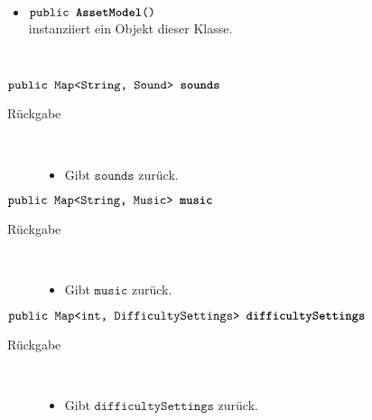 \begin{description}
\begin{itemize}
		\end{itemize}
	
\item[Konstruktoren] \hfill \\
	\vspace{-.8cm}
	\begin{itemize}
		\item $\texttt{public \textbf{AssetModel}()}$ \\ instanziiert ein Objekt dieser Klasse.

	\end{itemize}
	
\item[Methoden] \hfill \\
	\vspace{-.8cm}
		\item $\texttt{public Map<String, Sound> \textbf{sounds}}$ \\ 
		\begin{description}
			\item[Rückgabe] \hfill \\
			\vspace{-.8cm}
			\begin{itemize}
				\item Gibt $\texttt{sounds}$ zurück.
			\end{itemize}
			\end{description}
			
		\item $\texttt{public Map<String, Music> \textbf{music}}$ \\ 
		\begin{description}
			\item[Rückgabe] \hfill \\
			\vspace{-.8cm}
			\begin{itemize}
				\item Gibt $\texttt{music}$ zurück.
			\end{itemize}
			\end{description}

		\item $\texttt{public Map<int, DifficultySettings> \textbf{difficultySettings}}$ \\ 
		\begin{description}
			\item[Rückgabe] \hfill \\
			\vspace{-.8cm}
			\begin{itemize}
				\item Gibt $\texttt{difficultySettings}$ zurück.
			\end{itemize}
			\end{description}
			

\end{description}
